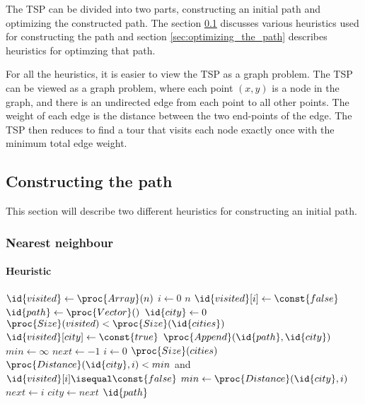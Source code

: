 The TSP can be divided into two parts, constructing an initial path and
optimizing the constructed path. The section \ref{sec:constructing_the_path}
discusses various heuristics used for constructing the path and section
\ref{sec:optimizing_the_path} describes heuristics for optimzing that path.  

For all the heuristics, it is easier to view the TSP as a graph problem.
The TSP can be viewed as a graph problem, where each point $(x, y)$ is a node in
the graph, and there is an undirected edge from each point to all other points. 
The weight of each edge is the distance between the two end-points of the edge.
The TSP then reduces to find a tour that visits each node exactly once with the
minimum total edge weight.

\subsection{Constructing the path}
\label{sec:constructing_the_path}
This section will describe two different heuristics for constructing an
initial path.

\subsubsection{Nearest neighbour}
\label{sec:nearest_neighbour}
\paragraph{Heuristic}
\begin{codebox}
\li $\id{visited} \gets \proc{Array}(n)$
\li \For $i \gets 0$ \To $n$
\li     \Do
            $\id{visited}[i] \gets \const{false}$
        \End
\li $\id{path} \gets \proc{Vector}()$
\li $\id{city} \gets 0$
\li \While $\proc{Size}(visited) < \proc{Size}(\id{cities})$
\label{li:nn:outer}
\li     \Do
            $\id{visited}[city] \gets \const{true}$
\li         $\proc{Append}(\id{path}, \id{city})$
\li         $min \gets \infty$
\li         $next \gets -1$
\li         \For $i \gets 0$ \To $\proc{Size}(cities)$ \label{li:nn:inner}
\li             \Do
                    \If $\proc{Distance}(\id{city}, i) < min$ and
                        $\id{visited}[i] \isequal \const{false}$
\li                     \Then
                            $min \gets \proc{Distance}(\id{city}, i)$
\li                         $next \gets i$
                        \End
                \End
\li         $city \gets next$
        \End
\li \Return $\id{path}$
\end{codebox}

